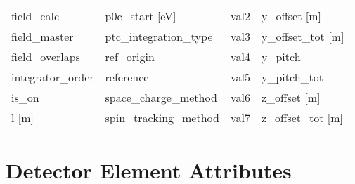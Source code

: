 \begin{tabular}{llll}
field_calc                     & p0c_start [eV]                 & val2                           & y_offset [m]                   \\
field_master                   & ptc_integration_type           & val3                           & y_offset_tot [m]               \\
field_overlaps                 & ref_origin                     & val4                           & y_pitch                        \\
integrator_order               & reference                      & val5                           & y_pitch_tot                    \\
is_on                          & space_charge_method            & val6                           & z_offset [m]                   \\
l [m]                          & spin_tracking_method           & val7                           & z_offset_tot [m]               \\
 \bottomrule
 \end{tabular}
 \vfill
 
 \section{Detector Element Attributes}
 \label{s:list.detector}
 
